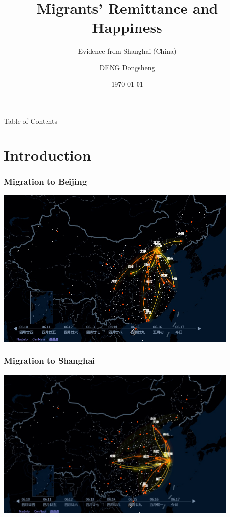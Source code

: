 \documentclass[10pt]{beamer}
\begin{document}
\title{Migrants\rq{} Remittance and Happiness}
\subtitle{Evidence from Shanghai (China)}
\author{DENG Dongsheng}
\date{\today}

\begin{frame}[plain]
  \titlepage
\end{frame}


\begin{frame}{Table of Contents}
  \tableofcontents
\end{frame}


\section{Introduction}

\begin{frame}[c]\frametitle{Migration to Beijing}
\begin{center}
   \includegraphics[width=0.9\textwidth]{baidu.png}
\end{center}

\end{frame}

\begin{frame}[c]\frametitle{Migration to Shanghai}
\begin{center}
   \includegraphics[width=0.9\textwidth]{baidu3.png}
\end{center}

\end{frame}
\end{document}

